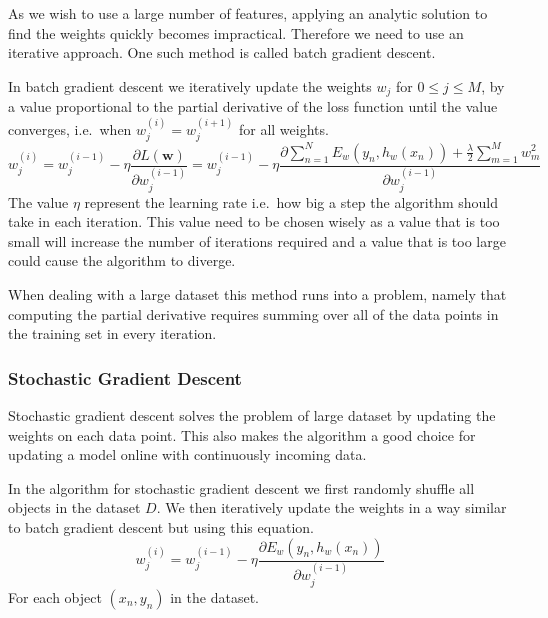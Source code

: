 As we wish to use a large number of features, applying an analytic solution to find the weights quickly becomes impractical.
Therefore we need to use an iterative approach.
One such method is called batch gradient descent.

In batch gradient descent we iteratively update the weights $w_j$ for $0 \leq j \leq M$, by a value proportional to the partial derivative of the loss function until the value converges, i.e.\ when $w_{j}^{(i)} = w_j^{(i+1)}$ for all weights.
\[ w_j^{(i)} = w_j^{(i-1)} - \eta \frac{\partial L(\mathbf{w})}{\partial w_j^{(i-1)}}
       = w_{j}^{(i-1)} - \eta \frac{\partial \sum_{n=1}^N E_w(y_n, h_w(x_n)) + \frac{\lambda}{2}\sum_{m=1}^M w_m^2}{\partial w_j^{(i-1)}} \]  
The value $\eta$ represent the learning rate i.e.\ how big a step the algorithm should take in each iteration.
This value need to be chosen wisely as a value that is too small will increase the number of iterations required and a value that is too large could cause the algorithm to diverge.

When dealing with a large dataset this method runs into a problem, namely that computing the partial derivative requires summing over all of the data points in the training set in every iteration. 

\subsubsection{Stochastic Gradient Descent}\label{sec:stochastic}

Stochastic gradient descent solves the problem of large dataset by updating the weights on each data point.
This also makes the algorithm a good choice for updating a model online with continuously incoming data. 

In the algorithm for stochastic gradient descent we first randomly shuffle all objects in the dataset $D$.
We then iteratively update the weights in a way similar to batch gradient descent but using this equation.
\[ w_j^{(i)} = w_j^{(i-1)} - \eta \frac{\partial E_w(y_n, h_w(x_n))}{\partial w_j^{(i-1)}} \]
For each object $(x_n, y_n)$ in the dataset.

